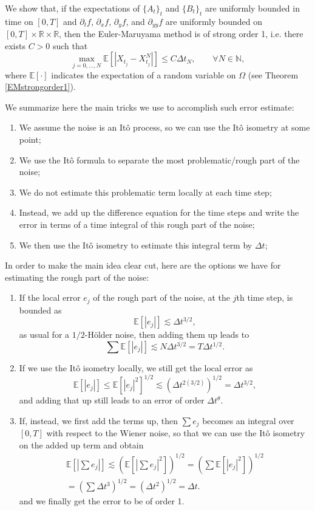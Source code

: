 \documentclass[reqno,12pt]{amsart}
\theoremstyle{plain}%
\theoremstyle{definition}
\begin{document}
We show that, if the expectations of $\{A_t\}_t$ and $\{B_t\}_t$ are uniformly bounded in time on $[0, T]$ and $\partial_t f$, $\partial_x f$, $\partial_y f$, and $\partial_{yy}f$ are uniformly bounded on $[0, T]\times \mathbb{R}\times \mathbb{R}$, then the Euler-Maruyama method is of strong order 1, i.e. there exists $C>0$ such that
\begin{equation}
    \max_{j=0, \ldots, N}\mathbb{E}\left[ \left| X_{t_j} - X_{t_j}^N \right| \right] \leq C \Delta t_N, \qquad \forall N \in \mathbb{N},
\end{equation}
where $\mathbb{E}[\cdot]$ indicates the expectation of a random variable on $\Omega$ (see Theorem \ref{EMstrongorder1}).

We summarize here the main tricks we use to accomplish such error estimate:
\begin{enumerate}
  \item We assume the noise is an It\^o process, so we can use the It\^o isometry at some point;
  \item We use the It\^o formula to separate the most problematic/rough part of the noise;
  \item We do not estimate this problematic term locally at each time step;
  \item Instead, we add up the difference equation for the time steps and write the error in terms of a time integral of this rough part of the noise;
  \item We then use the It\^o isometry to estimate this integral term by $\Delta t$;
\end{enumerate}

In order to make the main idea clear cut, here are the options we have for estimating the rough part of the noise:
\begin{enumerate}
  \item If the local error $e_j$ of the rough part of the noise, at the $j$th time step, is bounded as
    $$
    \mathbb{E}[|e_j|] \lesssim \Delta t^{3/2},
    $$
    as usual for a $1/2$-H\"older noise, then adding them up leads to 
    $$
      \sum \mathbb{E}[|e_j|] \lesssim N\Delta t^{3/2} = T\Delta t^{1/2}.
    $$
    \item If we use the It\^o isometry locally, we still get the local error as
    $$
      \mathbb{E}[|e_j|] \leq \mathbb{E}[|e_j|^2]^{1/2} \lesssim \left(\Delta t^{2(3/2)} \right)^{1/2} = \Delta t^{3/2},
    $$
    and adding that up still leads to an error of order $\Delta t^{\theta}$.
    \item If, instead, we first add the terms up, then $\sum e_j$ becomes an integral over $[0, T]$ with respect to the Wiener noise, so that we can use the It\^o isometry on the added up term and obtain
    \begin{multline*}
      \mathbb{E}\left[ \left| \sum e_j \right| \right] \lesssim \left(\mathbb{E}\left[ \left| \sum e_j \right|^2 \right]\right)^{1/2} = \left( \sum \mathbb{E}[|e_j|^2] \right)^{1/2} \\
      = \left( \sum \Delta t^3 \right)^{1/2} = \left( \Delta t^2 \right)^{1/2} = \Delta t.
    \end{multline*}
    and we finally get the error to be of order 1.
\end{enumerate}
\end{document}
